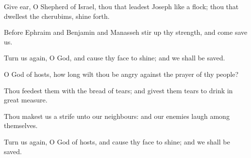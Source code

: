 {\Q {}Give
ear, O
Shepherd of
Israel, thou that
leadest
Joseph like a
flock; thou that
dwellest
{} the
cherubims, shine
forth.


\par }{\Q {}Before
Ephraim and
Benjamin and
Manasseh stir
up thy
strength, and
come
{}
save us.


\par }{\Q {}Turn us
again, O
God, and cause thy
face to
shine; and we shall be
saved.


\par }{\Q {}O
{}
God of
hosts, how long wilt thou be
angry against the
prayer of thy
people?


\par }{\Q {}Thou
feedest them with the
bread of
tears; and givest them
tears to
drink in great
measure.


\par }{\Q {}Thou
makest us a
strife unto our
neighbours: and our
enemies
laugh among themselves.


\par }{\Q {}Turn us
again, O
God of
hosts, and cause thy
face to
shine; and we shall be
saved.


\par }{\BB \par }
